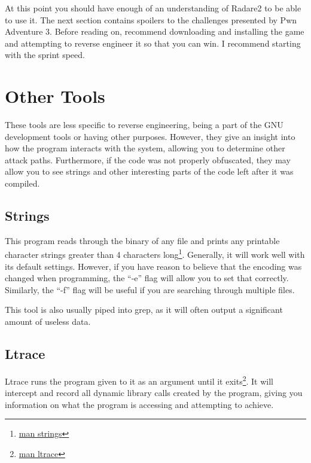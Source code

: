 			At this point you should have enough of an understanding of Radare2 to be able to use it.
			The next section contains spoilers to the challenges presented by Pwn Adventure 3.
			Before reading on, recommend downloading and installing the game and attempting to reverse engineer it so that you can win.
			I recommend starting with the sprint speed.
	\section{Other Tools}
		These tools are less specific to reverse engineering, being a part of the GNU development tools or having other purposes.
		However, they give an insight into how the program interacts with the system, allowing you to determine other attack paths.
		Furthermore, if the code was not properly obfuscated, they may allow you to see strings and other interesting parts of the code left after it was compiled.
		\subsection{Strings}
			This program reads through the binary of any file and prints any printable character strings greater than 4 characters long\footnote{\href{http://linuxcommand.org/man\_pages/strings1.html}{man strings}}.
			Generally, it will work well with its default settings.
			However, if you have reason to believe that the encoding was changed when programming, the ``-e'' flag will allow you to set that correctly.
			Similarly, the ``-f'' flag will be useful if you are searching through multiple files.

			This tool is also usually piped into grep, as it will often output a significant amount of useless data.
		\subsection{Ltrace}
			Ltrace runs the program given to it as an argument until it exits\footnote{\href{http://linuxcommand.org/man\_pages/ltrace1.html}{man ltrace}}.
			It will intercept and record all dynamic library calls created by the program, giving you information on what the program is accessing and attempting to achieve.

